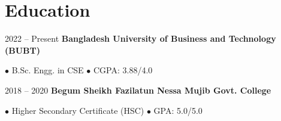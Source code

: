 \section{Education}

\begin{twocolentry}{
    2022 – Present
}
    \textbf{Bangladesh University of Business and Technology (BUBT)}
\end{twocolentry}

\vspace{0.10 cm}
\begin{onecolentry}
    \begin{highlights}
        \item[$\bullet$] B.Sc. Engg. in CSE \quad $\bullet$ CGPA: 3.88/4.0
    \end{highlights}
\end{onecolentry}

\vspace{.2 cm}

\begin{twocolentry}{
    2018 – 2020
}
    \textbf{Begum Sheikh Fazilatun Nessa Mujib Govt. College}
\end{twocolentry}

\vspace{0.10 cm}
\begin{onecolentry}
    \begin{highlights}
        \item[$\bullet$] Higher Secondary Certificate (HSC) \quad $\bullet$ GPA: 5.0/5.0
    \end{highlights}
\end{onecolentry}